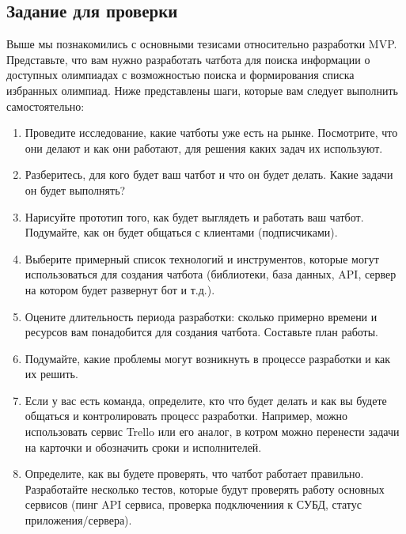 \documentclass[letterpaper,10pt,russian]{sphinxmanual}
\begin{document}
\subsection{Задание для проверки}
\label{\detokenize{educational_materials/mvp/content:id9}}
\sphinxAtStartPar
Выше мы познакомились с основными тезисами относительно разработки MVP. Представьте, что вам нужно разработать чат\sphinxhyphen{}бота для поиска информации о доступных олимпиадах с возможностью поиска и формирования списка избранных олимпиад. Ниже представлены шаги, которые вам следует выполнить самостоятельно:
\begin{enumerate}
%
\item {} 
\sphinxAtStartPar
Проведите исследование, какие чат\sphinxhyphen{}боты уже есть на рынке. Посмотрите, что они делают и как они работают, для решения каких задач их используют.

\item {} 
\sphinxAtStartPar
Разберитесь, для кого будет ваш чат\sphinxhyphen{}бот и что он будет делать. Какие задачи он будет выполнять?

\item {} 
\sphinxAtStartPar
Нарисуйте прототип того, как будет выглядеть и работать ваш чат\sphinxhyphen{}бот. Подумайте, как он будет общаться с клиентами (подписчиками).

\item {} 
\sphinxAtStartPar
Выберите примерный список технологий и инструментов, которые могут использоваться для создания чат\sphinxhyphen{}бота (библиотеки, база данных, API, сервер на котором будет развернут бот и т.д.).

\item {} 
\sphinxAtStartPar
Оцените длительность периода разработки: сколько примерно времени и ресурсов вам понадобится для создания чат\sphinxhyphen{}бота. Составьте план работы.

\item {} 
\sphinxAtStartPar
Подумайте, какие проблемы могут возникнуть в процессе разработки и как их решить.

\item {} 
\sphinxAtStartPar
Если у вас есть команда, определите, кто что будет делать и как вы будете общаться и контролировать процесс разработки. Например, можно использовать сервис Trello или его аналог, в котром можно перенести задачи на карточки и обозначить сроки и исполнителей.

\item {} 
\sphinxAtStartPar
Определите, как вы будете проверять, что чат\sphinxhyphen{}бот работает правильно. Разработайте несколько тестов, которые будут проверять работу основных сервисов (пинг API сервиса, проверка подключениия к СУБД, статус приложения/сервера).


\end{enumerate}
\end{document}
